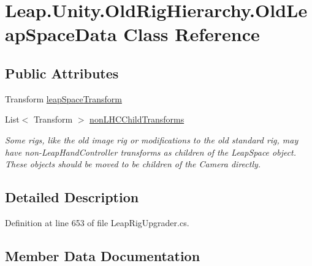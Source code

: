 \hypertarget{class_leap_1_1_unity_1_1_old_rig_hierarchy_1_1_old_leap_space_data}{}\section{Leap.\+Unity.\+Old\+Rig\+Hierarchy.\+Old\+Leap\+Space\+Data Class Reference}
\label{class_leap_1_1_unity_1_1_old_rig_hierarchy_1_1_old_leap_space_data}
\subsection*{Public Attributes}
\begin{DoxyCompactItemize}
\item 
Transform \mbox{\hyperlink{class_leap_1_1_unity_1_1_old_rig_hierarchy_1_1_old_leap_space_data_a2df72bc4798bb1cf23e6bb11c7f4546f}{leap\+Space\+Transform}}
\item 
List$<$ Transform $>$ \mbox{\hyperlink{class_leap_1_1_unity_1_1_old_rig_hierarchy_1_1_old_leap_space_data_ad44581a340d64a0e51b2cf26718b034b}{non\+L\+H\+C\+Child\+Transforms}}
\begin{DoxyCompactList}\small\item\em Some rigs, like the old image rig or modifications to the old standard rig, may have non-\/\+Leap\+Hand\+Controller transforms as children of the Leap\+Space object. These objects should be moved to be children of the Camera directly. \end{DoxyCompactList}\end{DoxyCompactItemize}


\subsection{Detailed Description}


Definition at line 653 of file Leap\+Rig\+Upgrader.\+cs.



\subsection{Member Data Documentation}
\mbox{\label{class_leap_1_1_unity_1_1_old_rig_hierarchy_1_1_old_leap_space_data_a2df72bc4798bb1cf23e6bb11c7f4546f}} 
